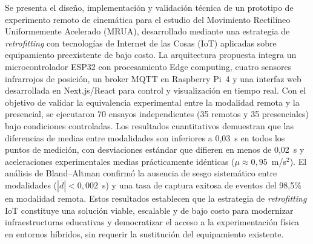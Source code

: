 \documentclass{espol-rte}
\begin{document}
\makertetitle

\begin{resumenespol}
Se presenta el dise\~no, implementaci\'on y validaci\'on t\'ecnica de un prototipo de experimento remoto de cinem\'atica para el estudio del Movimiento Rectil\'ineo Uniformemente Acelerado (MRUA), desarrollado mediante una estrategia de \textit{retrofitting} con tecnolog\'ias de Internet de las Cosas (IoT) aplicadas sobre equipamiento preexistente de bajo costo. La arquitectura propuesta integra un microcontrolador ESP32 con procesamiento Edge computing, cuatro sensores infrarrojos de posici\'on, un broker MQTT en Raspberry Pi~4 y una interfaz web desarrollada en Next.js/React para control y visualizaci\'on en tiempo real. Con el objetivo de validar la equivalencia experimental entre la modalidad remota y la presencial, se ejecutaron 70 ensayos independientes (35 remotos y 35 presenciales) bajo condiciones controladas. Los resultados cuantitativos demuestran que las diferencias de medias entre modalidades son inferiores a 0{,}03~s en todos los puntos de medici\'on, con desviaciones est\'andar que difieren en menos de 0{,}02~s y aceleraciones experimentales medias pr\'acticamente id\'enticas ($\mu \approx 0{,}95$~m/s$^2$). El an\'alisis de Bland--Altman confirm\'o la ausencia de sesgo sistem\'atico entre modalidades ($|\overline{d}| < 0{,}002$~s) y una tasa de captura exitosa de eventos del 98{,}5\% en modalidad remota. Estos resultados establecen que la estrategia de \textit{retrofitting} IoT constituye una soluci\'on viable, escalable y de bajo costo para modernizar infraestructuras educativas y democratizar el acceso a la experimentaci\'on f\'isica en entornos h\'ibridos, sin requerir la sustituci\'on del equipamiento existente.
\end{resumenespol}
\end{document}
